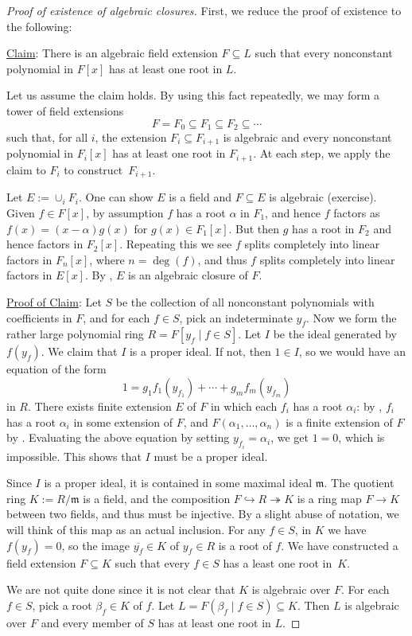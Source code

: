 \documentclass[12pt]{report}
\numberwithin{equation}{section}
\numberwithin{theorem}{chapter}
\theoremstyle{definition}
\newtheorem*{basic properties}{Basic Properties}
\newtheorem*{Important Remark}{Important Remark}
\newcommand{\m}{\mathfrak{m}}
\begin{document}
\begin{proof}[Proof of existence of algebraic closures]
First, we reduce the proof of existence to the following:

\underline{Claim}: There is an algebraic field extension $F \subseteq L$ such that every nonconstant polynomial in $F[x]$ has at least one root in $L$.

Let us assume the claim holds. By using this fact repeatedly, we may form a tower of field extensions
$$F = F_0 \subseteq F_1 \subseteq F_2 \subseteq  \cdots$$
such that, for all $i$, the extension $F_i \subseteq F_{i+1}$ is algebraic and every nonconstant polynomial in $F_i[x]$ has at least one root in $F_{i+1}$. At each step, we apply the claim to $F_i$ to construct~$F_{i+1}$.

Let $E := \cup_i F_i$. One can show $E$ is a field and $F \subseteq E$ is algebraic (exercise). 
Given $f \in F[x]$, by assumption $f$ has a root $\alpha$ in $F_1$, and hence $f$ factors as $f(x) = (x-\alpha) g(x)$ for $g(x) \in F_1[x]$. But then $g$ has a root in $F_2$ and hence factors in $F_2[x]$. Repeating this we see $f$ splits completely into linear factors in $F_n[x]$, where $n = \deg(f)$, and thus $f$ splits completely into linear factors in $E[x]$. By , $E$ is an algebraic closure of $F$.

\underline{Proof of Claim}:
Let $S$ be the collection of all nonconstant polynomials with coefficients in $F$, and for each $f \in S$, pick an indeterminate $y_f$.
Now we form the rather large polynomial ring $R = F[y_f \mid f \in S]$. Let $I$ be the ideal generated by $f(y_f)$. We claim that  $I$ is a proper ideal. If not, then $1 \in I$, so we would have an equation of the form
$$1 = g_1 f_1(y_{f_1}) + \cdots + g_m f_m(y_{f_m})$$
in $R$. There exists finite extension $E$ of $F$ in which each $f_i$ has a root $\alpha_i$: by , $f_i$ has a root $\alpha_i$ in some extension of $F$, and $F(\alpha_1, \ldots, \alpha_n)$ is a finite extension of $F$ by . Evaluating the above equation by setting $y_{f_i} = \alpha_i$, we get $1 = 0$, which is impossible. This shows that $I$ must be a proper ideal. 

Since $I$ is a proper ideal, it is contained in some maximal ideal $\m$. The quotient ring $K := R/\m$ is a field, and the composition $F \hookrightarrow R \twoheadrightarrow K$ is a ring map $F \to K$ between two fields, and thus must be injective. By a slight abuse of notation, we will think of this map as an actual inclusion. 
For any $f \in S$, in $K$ we have $f(y_f) = 0$, so the image $\overline{y_f} \in K$ of $y_f \in R$ is a root of $f$. We have constructed a field extension $F \subseteq K$ such that every $f \in S$ has a least one root in~$K$. 

We are not quite done since it is not clear that $K$ is algebraic over $F$. For each $f \in S$, pick a root $\beta_f \in K$ of $f$. Let $L=F(\beta_f \mid f \in S) \subseteq K$.
Then $L$ is algebraic over $F$ and every member of $S$ has at least one root in $L$.
\end{proof}
\end{document}
